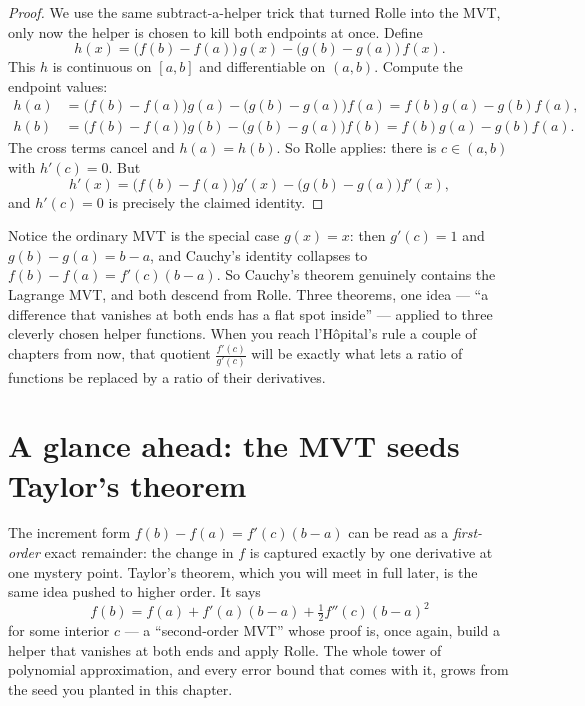 \begin{proof}
We use the same subtract-a-helper trick that turned Rolle into the MVT, only now the
helper is chosen to kill both endpoints at once. Define
\[
  h(x)=\bigl(f(b)-f(a)\bigr)\,g(x)-\bigl(g(b)-g(a)\bigr)\,f(x).
\]
This $h$ is continuous on $[a,b]$ and differentiable on $(a,b)$. Compute the
endpoint values:
\begin{align*}
  h(a)&=\bigl(f(b)-f(a)\bigr)g(a)-\bigl(g(b)-g(a)\bigr)f(a)
      =f(b)g(a)-g(b)f(a),\\
  h(b)&=\bigl(f(b)-f(a)\bigr)g(b)-\bigl(g(b)-g(a)\bigr)f(b)
      =f(b)g(a)-g(b)f(a).
\end{align*}
The cross terms cancel and $h(a)=h(b)$. So Rolle applies: there is $c\in(a,b)$ with
$h'(c)=0$. But
\[
  h'(x)=\bigl(f(b)-f(a)\bigr)g'(x)-\bigl(g(b)-g(a)\bigr)f'(x),
\]
and $h'(c)=0$ is precisely the claimed identity.
\end{proof}

\begin{connectionbox}
Notice the ordinary MVT is the special case $g(x)=x$: then $g'(c)=1$ and
$g(b)-g(a)=b-a$, and Cauchy's identity collapses to
$f(b)-f(a)=f'(c)(b-a)$. So Cauchy's theorem genuinely contains the Lagrange MVT, and
both descend from Rolle. Three theorems, one idea --- ``a difference that vanishes at
both ends has a flat spot inside'' --- applied to three cleverly chosen helper
functions. When you reach l'H\^opital's rule a couple of chapters from now, that
quotient $\frac{f'(c)}{g'(c)}$ will be exactly what lets a ratio of functions be
replaced by a ratio of their derivatives.
\end{connectionbox}

\section{A glance ahead: the MVT seeds Taylor's theorem}

The increment form $f(b)-f(a)=f'(c)(b-a)$ can be read as a \emph{first-order} exact
remainder: the change in $f$ is captured exactly by one derivative at one mystery
point. Taylor's theorem, which you will meet in full later, is the same idea pushed
to higher order. It says
\[
  f(b)=f(a)+f'(a)(b-a)+\tfrac12 f''(c)(b-a)^2
\]
for some interior $c$ --- a ``second-order MVT'' whose proof is, once again, build a
helper that vanishes at both ends and apply Rolle. The whole tower of polynomial
approximation, and every error bound that comes with it, grows from the seed you
planted in this chapter.

